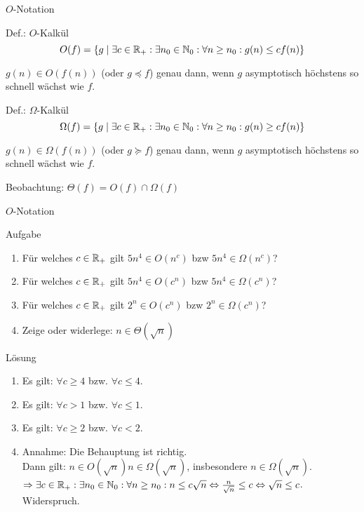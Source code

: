 \begin{frame}{$O$-Notation}
    \begin{block}{Def.: $O$-Kalkül}
    	\[
    		O(f) = \{ g \mid \exists c\in \mathbb{R}_+:\exists n_0\in\mathbb{N}_0: \forall n\geq n_0: g(n) \leq c f(n)\}
    	\]

    	$g(n) \in O(f(n))$ (oder $g \preceq f$) genau dann, wenn $g$ asymptotisch höchstens so schnell wächst wie $f$.
    \end{block}

    \begin{block}{Def.: $\Omega$-Kalkül}
    	\[
    		\Omega(f) = \{ g \mid \exists c\in \mathbb{R}_+:\exists n_0\in\mathbb{N}_0: \forall n\geq n_0: g(n) \geq c f(n)\}
    	\]
    	
    	$g(n) \in \Omega(f(n))$ (oder $g \succeq f$) genau dann, wenn $g$ asymptotisch höchstens so schnell wächst wie $f$.
    \end{block}

    Beobachtung: $\Theta(f) = O(f) \cap \Omega(f)$
\end{frame}

\begin{frame}{$O$-Notation}
	\begin{exampleblock}{Aufgabe}
		\begin{enumerate}
			\item Für welches $c \in \mathbb{R}_+$ gilt $5n^4 \in O(n^c)$ bzw $5n^4 \in \Omega(n^c)$?
			\item Für welches $c \in \mathbb{R}_+$ gilt $5n^4 \in O(c^n)$ bzw $5n^4 \in \Omega(c^n)$?
			\item Für welches $c \in \mathbb{R}_+$ gilt $2^n \in O(c^n)$ bzw $2^n \in \Omega(c^n)$?
			\item Zeige oder widerlege: $n \in \Theta(\sqrt{n})$
		\end{enumerate}
	\end{exampleblock}
\pause
	\begin{block}{Lösung}
		\begin{enumerate}
			\item Es gilt: $\forall c \geq 4$ bzw. $\forall c \leq 4$.
			\item Es gilt: $\forall c > 1$ bzw. $\forall c \leq 1$.
			\item Es gilt: $\forall c \geq 2$ bzw. $\forall c < 2$.
			\item \small Annahme: Die Behauptung ist richtig.\\
				Dann gilt: $n \in O(\sqrt{n})  n \in \Omega(\sqrt{n})$, insbesondere $n \in \Omega(\sqrt{n})$.\\
				$\Rightarrow \exists c\in \mathbb{R}_+:\exists n_0\in\mathbb{N}_0: \forall n\geq n_0: n \leq c \sqrt{n} \Leftrightarrow \frac{n}{\sqrt{n}} \leq c \Leftrightarrow \sqrt{n} \leq c$. Widerspruch.
				
		\end{enumerate}
	\end{block}
\end{frame}

